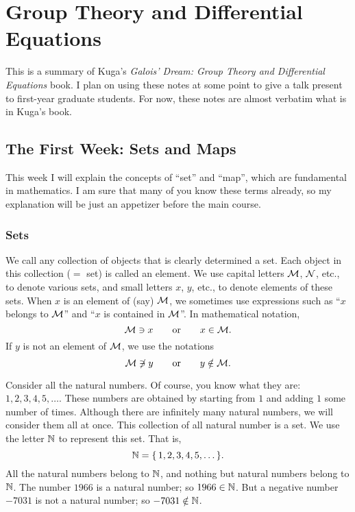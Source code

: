 \chapter{Group Theory and Differential Equations}
This is a summary of Kuga's \emph{Galois' Dream: Group Theory and
  Differential Equations} book. I plan on using these notes at some point
to give a talk present to first-year graduate students. For now, these
notes are almost verbatim what is in Kuga's book.

\section{The First Week: Sets and Maps}
This week I will explain the concepts of ``set'' and ``map'', which are
fundamental in mathematics. I am sure that many of you know these terms
already, so my explanation will be just an appetizer before the main
course.

\subsection{Sets}
We call any collection of objects that is clearly determined a set. Each
object in this collection (\(=\) set) is called an element. We use capital
letters \(\mathcal{M}\), \(\mathcal{N}\), etc., to denote various sets, and small
letters \(x\), \(y\), etc., to denote elements of these sets. When \(x\) is
an element of (say) \(\mathcal{M}\), we sometimes use expressions such as ``\(x\)
belongs to \(\mathcal{M}\)'' and ``\(x\) is contained in \(\mathcal{M}\)''. In
mathematical notation,
\[
  \mathcal{M}\ni x\qquad\text{or}\qquad x\in\mathcal{M}.
\]
If \(y\) is not an element of \(\mathcal{M}\), we use the notations
\[
  \mathcal{M}\not\ni y\qquad\text{or}\qquad y\notin\mathcal{M}.
\]

\begin{example}
  Consider all the natural numbers. Of course, you know what they are:
  \(1,2,3,4,5,\dotsc\). These numbers are obtained by starting from \(1\)
  and adding \(1\) some number of times. Although there are infinitely many
  natural numbers, we will consider them all at once. This collection of
  all natural number is a set. We use the letter \(\mathbb{N}\) to represent this
  set. That is,
  \[
    \mathbb{N}=\{\,1,2,3,4,5,\dotsc\,\}.
  \]
  All the natural numbers belong to \(\mathbb{N}\), and nothing but natural
  numbers belong to \(\mathbb{N}\). The number \(1966\) is a natural number; so
  \(1966\in\mathbb{N}\). But a negative number \(-7031\) is not a natural number;
  so \(-7031\notin\mathbb{N}\).
\end{example}

